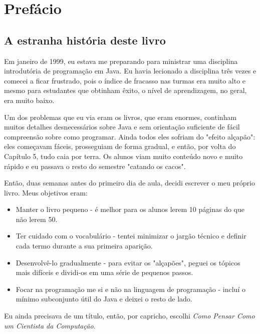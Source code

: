 \documentclass[10pt]{book}
\begin{document}
\chapter{Prefácio}

\section*{A estranha história deste livro}

Em janeiro de 1999, eu estava me preparando para ministrar uma disciplina introdutória de
programação em Java. Eu havia lecionado a disciplina três vezes e comecei a ficar
frustrado, pois o índice de fracasso nas turmas era muito alto e mesmo para
estudantes que obtinham êxito, o nível de aprendizagem, no geral, era muito baixo.

Um dos problemas que eu via eram os livros, que  
eram enormes, continham muitos detalhes desnecessários sobre Java e
sem orientação suficiente de fácil compreensão sobre como programar. Ainda todos eles
sofriam do "efeito alçapão": eles começavam fáceis,
prosseguiam de forma gradual, e então, por volta do Capítulo 5, tudo
caia por terra. Os alunos viam muito conteúdo novo e muito rápido
e eu passava o resto do semestre "catando os cacos".

Então, duas semanas antes do primeiro dia de aula, decidi escrever o meu
próprio livro.
Meus objetivos eram:

\begin{itemize}

\item Manter o livro pequeno - é melhor para os alunos lerem 10 páginas
do que não lerem 50.

\item Ter cuidado com o vocabulário - tentei minimizar o jargão técnico
e definir cada termo durante a sua primeira aparição.

\item Desenvolvê-lo gradualmente - para evitar os "alçapões", peguei os tópicos
mais difíceis e dividi-os em uma série de pequenos passos.

\item Focar na programação me si e não na linguagem de programação - incluí
o mínimo subconjunto útil do Java e deixei o resto de lado.

\end{itemize}

Eu ainda precisava de um título, então, por capricho, escolhi {\em Como Pensar Como
um Cientista da Computação}.
\end{document}
